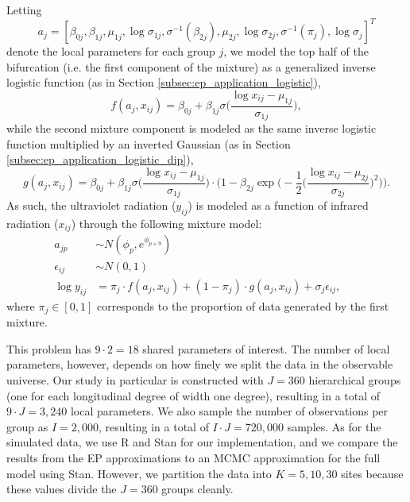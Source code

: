 Letting
$$ a_j = [\beta_{0j}, \beta_{1j}, \mu_{1j}, \log \sigma_{1j}, \sigma^{-1}(\beta_{2j}), \mu_{2j}, \log \sigma_{2j}, \sigma^{-1}(\pi_j), \log \sigma_j]^T$$
denote the local parameters for each group $j$, we model the top half of the bifurcation (i.e. the first component of the mixture) as a generalized inverse logistic function (as in Section \ref{subsec:ep_application_logistic}),
$$ f(a_j, x_{ij}) = \beta_{0j} + \beta_{1j} \sigma \biggl( \frac{ \log x_{ij} - \mu_{1j} }{ \sigma_{1j} } \biggr), $$
while the second mixture component is modeled as the same inverse logistic function multiplied by an inverted Gaussian (as in Section \ref{subsec:ep_application_logistic_dip}),
$$ g(a_j, x_{ij}) = \beta_{0j} + \beta_{1j} \sigma \biggl( \frac{ \log x_{ij} - \mu_{1j} }{ \sigma_{1j} } \biggr) \cdot
\biggl( 1 - \beta_{2j} \exp \biggl( -\frac{1}{2} \bigg( \frac{ \log x_{ij} - \mu_{2j} }{ \sigma_{2j} } \biggr)^2 \biggr) \biggr). $$
As such, the ultraviolet radiation ($y_{ij}$) is modeled as a function of infrared radiation ($x_{ij}$) through the following mixture model:
\begin{align}
    a_{jp} &\sim N(\phi_p, e^{ \phi_{p+9} } ) && \\\nonumber
    \epsilon_{ij} &\sim N(0,1) && \\\nonumber
    \log y_{ij} &= \pi_j \cdot f(a_j, x_{ij}) + (1 - \pi_j) \cdot g(a_j, x_{ij}) + \sigma_j \epsilon_{ij}, 
\end{align}
where $\pi_j \in [0,1]$ corresponds to the proportion of data generated by the first mixture.

This problem has $9 \cdot 2 = 18$ shared parameters of interest. The number of local parameters, however, depends on how finely we split the data in the observable universe. Our study in particular is constructed with $J = 360$ hierarchical groups (one for each longitudinal degree of width one degree), resulting in a total of $9 \cdot J = 3,240$ local parameters. We also sample the number of observations per group as $I = 2,000$, resulting in a total of $I \cdot J = 720,000$ samples. As for the simulated data, we use R and Stan for our implementation, and we compare the results from the EP approximations to an MCMC approximation for the full model using Stan. However, we partition the data into $K = 5, 10, 30$ sites because these values divide the $J = 360$ groups cleanly.
